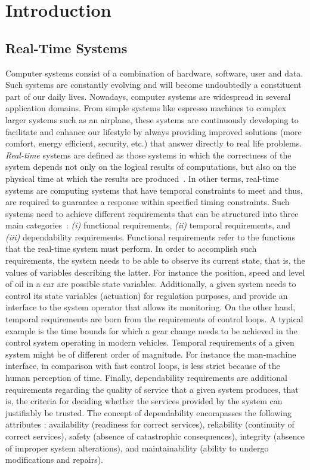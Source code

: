 \chapter{Introduction}

\section{Real-Time Systems}

Computer systems consist of a combination of hardware, software, user and data. Such
systems are constantly evolving and will become undoubtedly a constituent part of our daily 
lives.
Nowadays, computer systems are widespread in several application domains. From simple systems
like espresso machines to complex larger systems such as an airplane, these systems are
continuously developing to facilitate and enhance our lifestyle by always providing improved 
solutions (more comfort, energy efficient, security, etc.) that answer directly to real life 
problems.  
\emph{Real-time} systems are defined as those systems in which the correctness of the system
depends not only on the logical results of computations, but also on the physical time at which 
the results are produced~\cite{intro:stan88}.
In other terms, real-time systems are computing systems that have temporal constraints to meet
and thus, are required to guarantee a response within specified timing constraints. 
Such systems need to achieve different requirements that can be structured into three main 
categories~\cite{intro:kopetz11}: \emph{(i)} functional requirements, 
\emph{(ii)} temporal requirements, and \emph{(iii)} dependability requirements.
Functional requirements refer to the functions that the real-time system must perform. 
In order to accomplish such requirements, the system needs to be able to observe its current
state, that is, the values of variables describing the latter. For instance the position, speed
and level of oil in a car are possible state variables. Additionally, a given system 
needs to control its state variables (actuation) for regulation purposes, and provide an 
interface to the system operator that allows its monitoring.
On the other hand, temporal requirements are born from the requirements of control loops. 
A typical example is the time bounds for which a gear change needs to be achieved in the control
system operating in modern vehicles. Temporal requirements of a given system might be of
different order of magnitude. For instance the man-machine interface, in comparison with fast
control loops, is less strict because of the human perception of time. Finally, dependability
requirements are additional requirements regarding the quality of service that a given system
produces, that is, the criteria for deciding whether the services provided by the system can 
justifiably be trusted. The concept of dependability encompasses the following attributes
\cite{intro:aviz04}: availability (readiness for correct services), reliability (continuity of
correct services), safety (absence of catastrophic consequences), integrity (absence of 
improper system alterations), and maintainability (ability to undergo modifications and repairs).

